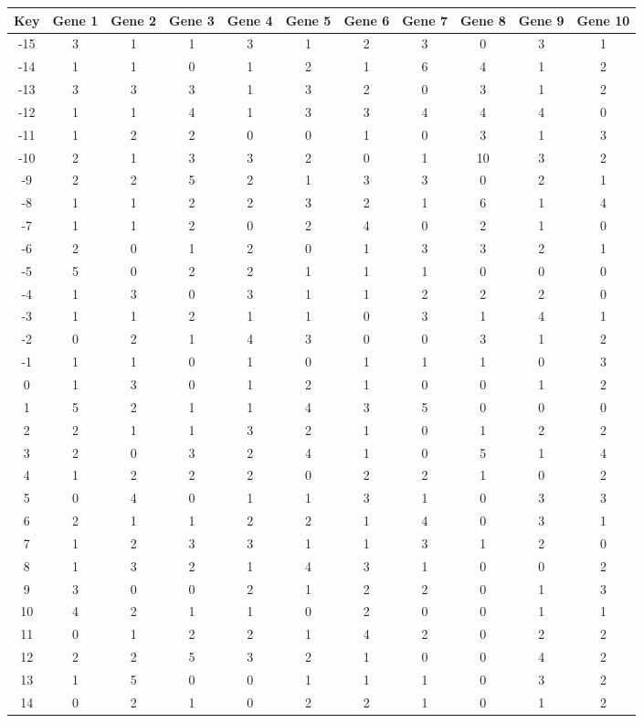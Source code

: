 \begin{tabular}{|c|c|c|c|c|c|c|c|c|c|c|}
\hline
Key & Gene 1 & Gene 2 & Gene 3 & Gene 4 & Gene 5 & Gene 6 & Gene 7 & Gene 8 & Gene 9 & Gene 10 \\
\hline
-15 & 3 & 1 & 1 & 3 & 1 & 2 & 3 & 0 & 3 & 1 \\
-14 & 1 & 1 & 0 & 1 & 2 & 1 & 6 & 4 & 1 & 2 \\
-13 & 3 & 3 & 3 & 1 & 3 & 2 & 0 & 3 & 1 & 2 \\
-12 & 1 & 1 & 4 & 1 & 3 & 3 & 4 & 4 & 4 & 0 \\
-11 & 1 & 2 & 2 & 0 & 0 & 1 & 0 & 3 & 1 & 3 \\
-10 & 2 & 1 & 3 & 3 & 2 & 0 & 1 & 10 & 3 & 2 \\
-9 & 2 & 2 & 5 & 2 & 1 & 3 & 3 & 0 & 2 & 1 \\
-8 & 1 & 1 & 2 & 2 & 3 & 2 & 1 & 6 & 1 & 4 \\
-7 & 1 & 1 & 2 & 0 & 2 & 4 & 0 & 2 & 1 & 0 \\
-6 & 2 & 0 & 1 & 2 & 0 & 1 & 3 & 3 & 2 & 1 \\
-5 & 5 & 0 & 2 & 2 & 1 & 1 & 1 & 0 & 0 & 0 \\
-4 & 1 & 3 & 0 & 3 & 1 & 1 & 2 & 2 & 2 & 0 \\
-3 & 1 & 1 & 2 & 1 & 1 & 0 & 3 & 1 & 4 & 1 \\
-2 & 0 & 2 & 1 & 4 & 3 & 0 & 0 & 3 & 1 & 2 \\
-1 & 1 & 1 & 0 & 1 & 0 & 1 & 1 & 1 & 0 & 3 \\
0 & 1 & 3 & 0 & 1 & 2 & 1 & 0 & 0 & 1 & 2 \\
1 & 5 & 2 & 1 & 1 & 4 & 3 & 5 & 0 & 0 & 0 \\
2 & 2 & 1 & 1 & 3 & 2 & 1 & 0 & 1 & 2 & 2 \\
3 & 2 & 0 & 3 & 2 & 4 & 1 & 0 & 5 & 1 & 4 \\
4 & 1 & 2 & 2 & 2 & 0 & 2 & 2 & 1 & 0 & 2 \\
5 & 0 & 4 & 0 & 1 & 1 & 3 & 1 & 0 & 3 & 3 \\
6 & 2 & 1 & 1 & 2 & 2 & 1 & 4 & 0 & 3 & 1 \\
7 & 1 & 2 & 3 & 3 & 1 & 1 & 3 & 1 & 2 & 0 \\
8 & 1 & 3 & 2 & 1 & 4 & 3 & 1 & 0 & 0 & 2 \\
9 & 3 & 0 & 0 & 2 & 1 & 2 & 2 & 0 & 1 & 3 \\
10 & 4 & 2 & 1 & 1 & 0 & 2 & 0 & 0 & 1 & 1 \\
11 & 0 & 1 & 2 & 2 & 1 & 4 & 2 & 0 & 2 & 2 \\
12 & 2 & 2 & 5 & 3 & 2 & 1 & 0 & 0 & 4 & 2 \\
13 & 1 & 5 & 0 & 0 & 1 & 1 & 1 & 0 & 3 & 2 \\
14 & 0 & 2 & 1 & 0 & 2 & 2 & 1 & 0 & 1 & 2 \\
\hline
\end{tabular}